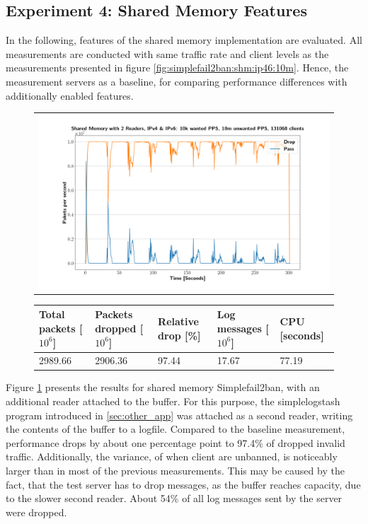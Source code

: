 \pagebreak

\subsection{Experiment 4: Shared Memory Features}

In the following, features of the shared memory implementation are evaluated. All measurements are conducted with same traffic rate and client levels as the measurements presented in figure \ref{fig:simplefail2ban:shm:ip46:10m}.
Hence, the measurement servers as a baseline, for comparing performance differences with additionally enabled features.

\begin{figure}[!h]
	\centering
	\scriptsize
	\begin{tabular}{c}
    	\centerline{\includegraphics[width=1.2\textwidth]{images/simplefail2ban_shm_2r_ipv46_v10k_iv10m_c131068.png}}
	\end{tabular}
	\begin{tabular}{lllll}
		\toprule
		\textbf{Total packets [$10^6$]} & \textbf{Packets dropped [$10^6$]} & \textbf{Relative drop [\%]} & \textbf{Log messages [$10^6$]} & \textbf{CPU [seconds]} \\ \midrule 
		2989.66 & 2906.36 & 97.44 & 17.67 & 77.19 \\
		\bottomrule
	\end{tabular}
	\caption[Simplefail2ban, Shared Memory 2 Readers]{}
	\label{fig:simplefail2ban:shm:2r}
\end{figure}

Figure \ref{fig:simplefail2ban:shm:2r} presents the results for shared memory Simplefail2ban, with an additional reader attached to the buffer. For this purpose, the simplelogstash
program introduced in \ref{sec:other_app} was attached as a second reader, writing the contents of the buffer to a logfile. Compared to the baseline measurement, performance drops by about one percentage
point to 97.4\% of dropped invalid traffic. Additionally, the variance, of when client are unbanned, is noticeably larger
than in most of the previous measurements. This may be caused by the fact, that the test server has to drop messages, as the buffer reaches capacity, due to the slower second reader.
About 54\% of all log messages sent by the server were dropped.   

